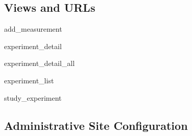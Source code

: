 \documentclass[letterpaper,10pt,english]{sphinxmanual}
\begin{document}
\subsection{Views and URLs}
\hypertarget{module-data.views}{}
\modulesynopsis{}

\hypertarget{data.views.add_measurement}{}\begin{memberdesc}{add\_measurement}\end{memberdesc}

\hypertarget{data.views.experiment_detail}{}\begin{memberdesc}{experiment\_detail}\end{memberdesc}

\hypertarget{data.views.experiment_detail_all}{}\begin{memberdesc}{experiment\_detail\_all}\end{memberdesc}

\hypertarget{data.views.experiment_list}{}\begin{memberdesc}{experiment\_list}\end{memberdesc}

\hypertarget{data.views.study_experiment}{}\begin{memberdesc}{study\_experiment}\end{memberdesc}
\hypertarget{module-data.urls}{}
\modulesynopsis{}

\subsection{Administrative Site Configuration}
\hypertarget{module-data.admin}{}
\modulesynopsis{}
\end{document}
